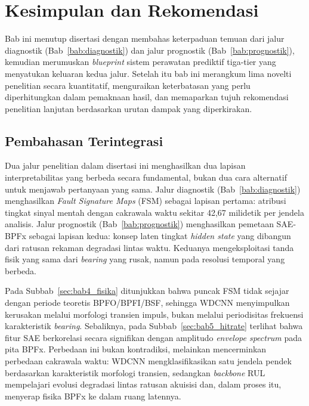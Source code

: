 \chapter{Kesimpulan dan Rekomendasi}
\label{bab:kesimpulan}

Bab ini menutup disertasi dengan membahas keterpaduan temuan dari jalur
diagnostik (Bab~\ref{bab:diagnostik}) dan jalur prognostik
(Bab~\ref{bab:prognostik}), kemudian merumuskan \emph{blueprint} sistem
perawatan prediktif tiga-tier yang menyatukan keluaran kedua jalur. Setelah
itu bab ini merangkum lima novelti penelitian secara kuantitatif, menguraikan
keterbatasan yang perlu diperhitungkan dalam pemaknaan hasil, dan
memaparkan tujuh rekomendasi penelitian lanjutan berdasarkan urutan
dampak yang diperkirakan.

\section{Pembahasan Terintegrasi}
\label{sec:bab6_pembahasan_terintegrasi}

Dua jalur penelitian dalam disertasi ini menghasilkan dua lapisan
interpretabilitas yang berbeda secara fundamental, bukan dua cara alternatif
untuk menjawab pertanyaan yang sama. Jalur diagnostik (Bab~\ref{bab:diagnostik})
menghasilkan \emph{Fault Signature Maps} (FSM) sebagai lapisan pertama: atribusi
tingkat sinyal mentah dengan cakrawala waktu sekitar 42,67 milidetik per jendela
analisis. Jalur prognostik (Bab~\ref{bab:prognostik}) menghasilkan pemetaan
SAE-BPFx sebagai lapisan kedua: konsep laten tingkat \emph{hidden state} yang
dibangun dari ratusan rekaman degradasi lintas waktu. Keduanya mengeksploitasi
tanda fisik yang sama dari \emph{bearing} yang rusak, namun pada resolusi temporal
yang berbeda.

Pada Subbab~\ref{sec:bab4_fisika} ditunjukkan bahwa puncak FSM tidak sejajar
dengan periode teoretis BPFO/BPFI/BSF, sehingga WDCNN menyimpulkan kerusakan
melalui morfologi transien impuls, bukan melalui periodisitas frekuensi
karakteristik \emph{bearing}. Sebaliknya, pada Subbab~\ref{sec:bab5_hitrate} terlihat
bahwa fitur SAE berkorelasi secara signifikan dengan amplitudo \emph{envelope
spectrum} pada pita BPFx. Perbedaan ini bukan kontradiksi, melainkan
mencerminkan perbedaan cakrawala waktu: WDCNN mengklasifikasikan satu jendela
pendek berdasarkan karakteristik morfologi transien, sedangkan \emph{backbone}
RUL mempelajari evolusi degradasi lintas ratusan akuisisi dan, dalam proses
itu, menyerap fisika BPFx ke dalam ruang latennya.

